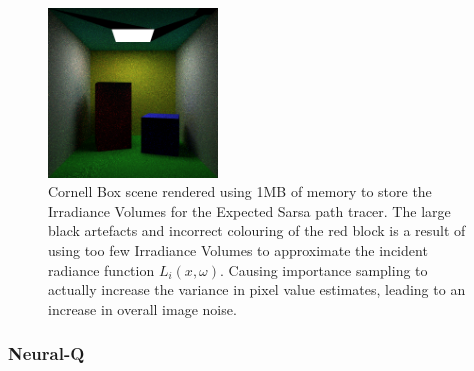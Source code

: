 \documentclass[../dissertation.tex]{subfiles}
\begin{document}
\begin{figure}[h]
\centering
\includegraphics[width=0.4\textwidth]{images/renders/sarsa_128_1Mb_incorrect.png}   
\caption{Cornell Box scene rendered using 1MB of memory to store the Irradiance Volumes for the Expected Sarsa path tracer. The large black artefacts and incorrect colouring of the red block is a result of using too few Irradiance Volumes to approximate the incident radiance function $L_i(x, \omega)$. Causing importance sampling to actually increase the variance in pixel value estimates, leading to an increase in overall image noise.}
\label{fig:incorrect_cornell}
\end{figure}

\subsubsection{Neural-Q}
\end{document}
